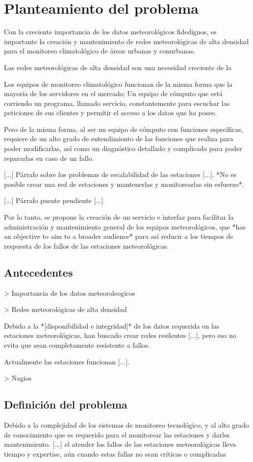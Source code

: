 \section{Planteamiento del problema}

Con la creciente importancia de los datos meteorológicos fidedignos, es importante la creación y mantenimiento de redes meteorológicas de alta densidad para el monitoreo climatológico de áreas urbanas y conurbanas.




Las redes meteorológicas de alta densidad son una necesidad creciente de la

Los equipos de monitoreo climatológico funcionan de la misma forma que la mayoría de los servidores en el mercado; Un equipo de cómputo que está corriendo un programa, llamado servicio, constantemente para escuchar las peticiones de sus clientes y permitir el acceso a los datos que ha posee.

Pero de la misma forma, al ser un equipo de cómputo con funciones específicas, requiere de un alto grado de entendimiento de las funciones que realiza para poder modificarlas, así como un diagnóstico detallado y complicado para poder repararlas en caso de un fallo.

[...] Párrafo sobre los problemas de escalabilidad de las estaciones [...]. *No es posible crear una red de estaciones y mantenerlas y monitorearlas sin esfuerzo*.

[...] Párrafo puente pendiente [...]

Por lo tanto, se propone la creación de un servicio e interfaz para facilitar la administración y mantenimiento general de los equipos meteorológicos, que *has an objective to aim to a broader audience* para así reducir a los tiempos de respuesta de los fallos de las estaciones meteorológicas.


\subsection{Antecedentes}\label{sec:Ant}

> Importancia de los datos meteoroleogicos

> Redes meteorológicas de alta densidad



Debido a la *[disponibilidad e integridad]* de los datos requerida en las estaciones meteorológicas, han buscado crear redes resilentes [...], pero eso no evita que sean completamente resistente a fallos.

Actualmente las estaciones funcionan [...].

> Nagios

\subsection{Definición del problema}

Debido a la complejidad de los sistemas de monitoreo tecnológico, y al alto grado de conocimiento que es requerido para el monitorear las estaciones y darles mantenimiento. [...] el atender los fallos de las estaciones meteorológicas lleva tiempo y expertise, aún cuando estas fallas no sean críticas o complicadas
